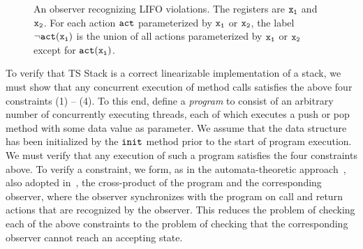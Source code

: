 \begin{figure}
\caption{An observer recognizing LIFO violations. The registers are $\tt x_1$ and $\tt x_2$. For each action $\tt act$ parameterized by $\tt x_1$ or $\tt x_2$, the label $\tt \neg act(x_i)$ is the union of  all actions parameterized by $\tt x_1$ or $\tt x_2$ except for $\tt act(x_i)$.  
}
\label{fig:lifostack:fig}
\end{figure}

To verify that TS Stack is a correct linearizable implementation of a stack, we
must show that any concurrent execution of method calls satisfies the
above four constraints (1) -- (4).
To this end, define a {\em program} to consist 
of an arbitrary number of concurrently executing threads,
%
each of which executes a push or pop method with some data value as parameter.
We assume that the data structure has been initialized
by the ${\tt init}$ method prior to the start of program execution.
We must verify that any execution of such a program satisfies the four
constraints above. To verify a constraint, 
we form, as in the automata-theoretic approach~\cite{VW:modelchecking},
also adopted in~\cite{AHHR:integrated},
the cross-product of the program  and the corresponding
observer, where the observer synchronizes with the program on call and
return actions that are recognized by the observer. This reduces the
problem of checking each of the above constraints to the problem of checking
that the corresponding observer cannot reach an accepting state.

